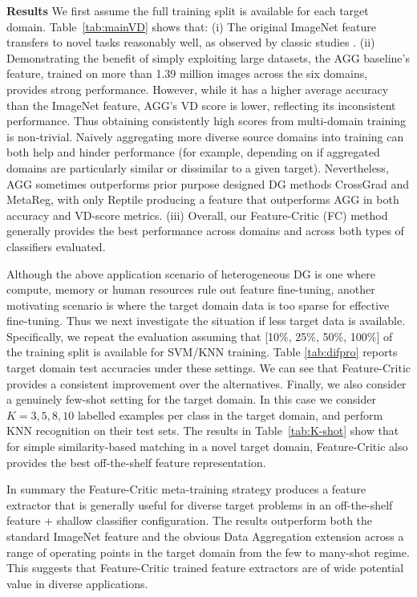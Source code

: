 \documentclass{article}
\newcommand{\modelname}{Feature-Critic}
\newcommand{\keypoint}[1]{\vspace{0.0cm}\noindent\textbf{#1}\quad}
\begin{document}
\keypoint{Results}
We first assume the full training split is available for each target domain. Table~\ref{tab:mainVD} shows that: (i) The original ImageNet feature transfers to novel tasks reasonably well, as observed by classic studies \cite{yosinski2014howTransferable}. (ii) Demonstrating the benefit of simply exploiting large datasets, the  AGG baseline's feature, trained on more than 1.39 million images across the six domains, provides strong performance. However, while it has a higher average accuracy than the ImageNet feature, AGG's VD score is lower, reflecting its inconsistent performance. Thus obtaining consistently high scores from multi-domain training is non-trivial. Naively aggregating more diverse source domains into training can both help and hinder performance (for example, depending on if aggregated domains are particularly similar or dissimilar to a given target). Nevertheless, AGG sometimes outperforms prior purpose designed DG methods CrossGrad and MetaReg, with only Reptile producing a feature that outperforms AGG in both accuracy and VD-score metrics. (iii) Overall, our  \modelname{} (FC) method generally provides the best performance across domains and across both types of classifiers evaluated. 

Although the above application scenario of heterogeneous DG is one where compute, memory or human resources rule out feature fine-tuning, another motivating scenario is where the target domain data is too sparse for effective fine-tuning. Thus we next investigate the situation if less target data is available. Specifically, we repeat the evaluation assuming that  [10$\%$, 25$\%$, 50$\%$, 100$\%$] of the training split is available for SVM/KNN training. Table \ref{tab:difpro} reports target domain test accuracies under these settings. We can see that \modelname{} provides a consistent improvement over the alternatives. Finally, we also consider a genuinely few-shot setting for the target domain. In this case we consider $K=3,5,8,10$ labelled examples per class in the target domain, and perform KNN recognition on their test sets. The results in Table~\ref{tab:K-shot} show that for simple similarity-based matching in a novel target domain, \modelname{} also provides the best off-the-shelf feature representation.

In summary the \modelname{} meta-training strategy produces a feature extractor that is generally useful for diverse target problems in an off-the-shelf feature + shallow classifier configuration. The results outperform both the standard ImageNet feature and the obvious Data Aggregation extension across a range of operating points in the target domain from the few to many-shot regime. This suggests that \modelname{} trained feature extractors are of wide potential value in diverse applications.
\end{document}
